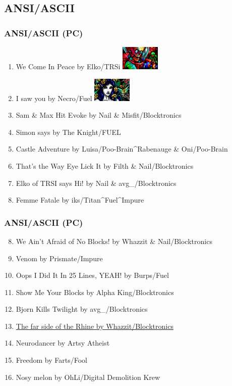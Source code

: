 \documentclass{beamer}
\begin{document}
\subsection{ANSI/ASCII}
\begin{frame}
  \frametitle{ANSI/ASCII (PC)}
  \begin{enumerate}
  \item We Come In Peace by Elko/TRSi \href{https://demozoo.org/graphics/191891/}{\includegraphics[width=5em]{we_come_in_peace}}
  \item I saw you by Necro/Fuel \href{https://demozoo.org/graphics/191896/}{\includegraphics[width=5em]{i_saw_you}}
  \item Sam \& Max Hit Evoke by Nail \& Misfit/Blocktronics 
  \item Simon says by The Knight/FUEL
  \item Castle Adventure by Luisa/Poo-Brain\^{}Rabenauge \& Oni/Poo-Brain
  \item That's the Way Eye Lick It by Filth \& Nail/Blocktronics 
  \item Elko of TRSI says Hi! by Nail \& avg\_/Blocktronics 
  \item Femme Fatale by iks/Titan\^{}Fuel\^{}Impure
  \end{enumerate}
\end{frame}
\begin{frame}
  \frametitle{ANSI/ASCII (PC)}
  \begin{enumerate}
    \setcounter{enumi}{7}
  \item We Ain't Afraid of No Blocks!  by Whazzit \& Nail/Blocktronics
  \item Venom by Prismate/Impure 
  \item Oops I Did It In 25 Lines, YEAH! by Burps/Fuel 
  \item Show Me Your Blocks by Alpha King/Blocktronics 
  \item Bjorn Kills Twilight by avg\_/Blocktronics 
  \item \href{https://demozoo.org/graphics/191893/}{The far side of the Rhine by Whazzit/Blocktronics}
  \item Neurodancer by Artsy Atheist 
  \item Freedom by Farts/Fool 
  \item Nosy melon by OhLi/Digital Demolition Krew
  \end{enumerate}
\end{frame}
\end{document}
